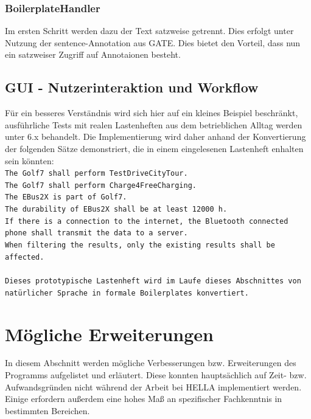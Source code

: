 \documentclass[12pt]{report}
\begin{document}
\subsubsection{BoilerplateHandler}
Im ersten Schritt werden dazu der Text satzweise getrennt. Dies erfolgt unter Nutzung der sentence-Annotation aus GATE. Dies bietet den Vorteil, dass nun ein satzweiser Zugriff auf Annotaionen besteht.
\subsection{GUI - Nutzerinteraktion und Workflow}
Für ein besseres Verständnis wird sich hier auf ein kleines Beispiel beschränkt, ausführliche Tests mit realen Lastenheften aus dem betrieblichen Alltag werden unter 6.x behandelt. Die Implementierung wird daher anhand der Konvertierung der folgenden Sätze demonstriert, die in einem eingelesenen Lastenheft enhalten sein könnten:
\tt \\
The Golf7 shall perform TestDriveCityTour.\\

The Golf7 shall perform Charge4FreeCharging.\\

The EBus2X is part of Golf7.\\

The durability of EBus2X shall be at least 12000 h.\\

If there is a connection to the internet, the Bluetooth connected phone shall transmit the data to a server.\\

When filtering the results, only the existing results shall be affected.\\
\\ \rm
Dieses prototypische Lastenheft wird im Laufe dieses Abschnittes von natürlicher Sprache in formale Boilerplates konvertiert. 
\section{Mögliche Erweiterungen}
In diesem Abschnitt werden mögliche Verbesserungen bzw. Erweiterungen des Programms aufgelistet und erläutert. Diese konnten hauptsächlich auf Zeit- bzw. Aufwandsgründen nicht während der Arbeit bei HELLA implementiert werden. Einige erfordern außerdem eine hohes Maß an spezifischer Fachkenntnis in bestimmten Bereichen. 
\end{document}
